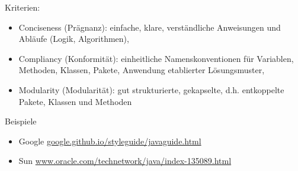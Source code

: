 Kriterien:
\begin{itemize}
\item Conciseness (Prägnanz): einfache, klare, verständliche Anweisungen und
  Abläufe (Logik, Algorithmen),
\item Compliancy (Konformität): einheitliche Namenskonventionen für Variablen,
  Methoden, Klassen, Pakete, Anwendung etablierter Lösungsmuster,
\item Modularity (Modularität): gut strukturierte, gekapselte,
  d.h. entkoppelte Pakete, Klassen und Methoden
\end{itemize}

Beispiele
\begin{itemize}
\item Google \href{https://google.github.io/styleguide/javaguide.html}
            {google.github.io/styleguide/javaguide.html}
\item Sun \href{http://www.oracle.com/technetwork/java/index-135089.html}
          {www.oracle.com/technetwork/java/index-135089.html}
\end{itemize}
%
\ifslides
\newpage
\fi
